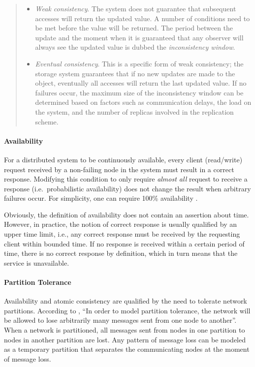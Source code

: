 \begin{quote}
  \begin{itemize}
    \item \emph{Weak consistency}. The system does not guarantee that subsequent accesses will return the updated value. A number of conditions need to be met before the value will be returned. The period between the update and the moment when it is guaranteed that any observer will always see the updated value is dubbed the \emph{inconsistency window}.
    \item \emph{Eventual consistency}. This is a specific form of weak consistency; the storage system guarantees that if no new updates are made to the object, eventually all accesses will return the last updated value. If no failures occur, the maximum size of the inconsistency window can be determined based on factors such as communication delays, the load on the system, and  the number of replicas involved in the replication scheme.
  \end{itemize}
\end{quote}

\paragraph{Availability}
For a distributed system to be continuously available, every client (read/write) request received by a non-failing node in the system must result in a correct response. Modifying this condition to only require \emph{almost all} request to receive a response (i.e.\ probabilistic availability) does not change the result when arbitrary failures occur. For simplicity, one can require 100\% availability \cite{GL02}.

Obviously, the definition of availability does not contain an assertion about time. However, in practice, the notion of correct response is usually qualified by an upper time limit, i.e., any correct response must be received by the requesting client within bounded time. If no response is received within a certain period of time, there is no correct response by definition, which in turn means that the service is unavailable.

\paragraph{Partition Tolerance}
Availability and atomic consistency are qualified by the need to tolerate
network partitions. According to \cite{GL02}, ``In order to model partition tolerance, the network will be allowed to lose arbitrarily many messages sent
from one node to another''. When a network is partitioned, all messages sent
from nodes in one partition to nodes in another partition are lost. Any pattern
of message loss can be modeled as a temporary partition that separates the
communicating nodes at the moment of message loss.


